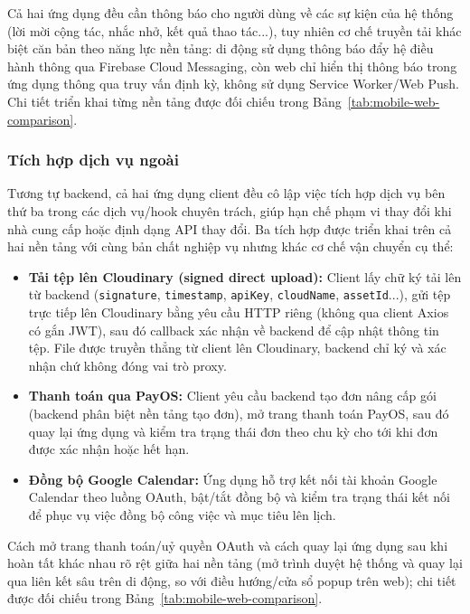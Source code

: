 Cả hai ứng dụng đều cần thông báo cho người dùng về các sự kiện của hệ thống (lời mời cộng tác, nhắc nhở, kết quả thao tác...), tuy nhiên cơ chế truyền tải khác biệt căn bản theo năng lực nền tảng: di động sử dụng thông báo đẩy hệ điều hành thông qua Firebase Cloud Messaging, còn web chỉ hiển thị thông báo trong ứng dụng thông qua truy vấn định kỳ, không sử dụng Service Worker/Web Push. Chi tiết triển khai từng nền tảng được đối chiếu trong Bảng~\ref{tab:mobile-web-comparison}.

\subsubsection{Tích hợp dịch vụ ngoài}
\label{subsubsec:frontend-integrations}

Tương tự backend, cả hai ứng dụng client đều cô lập việc tích hợp dịch vụ bên thứ ba trong các dịch vụ/hook chuyên trách, giúp hạn chế phạm vi thay đổi khi nhà cung cấp hoặc định dạng API thay đổi. Ba tích hợp được triển khai trên cả hai nền tảng với cùng bản chất nghiệp vụ nhưng khác cơ chế vận chuyển cụ thể:

\begin{itemize}
    \item \textbf{Tải tệp lên Cloudinary (signed direct upload):} Client lấy chữ ký tải lên từ backend (\texttt{signature}, \texttt{timestamp}, \texttt{apiKey}, \texttt{cloudName}, \texttt{assetId}...), gửi tệp trực tiếp lên Cloudinary bằng yêu cầu HTTP riêng (không qua client Axios có gắn JWT), sau đó callback xác nhận về backend để cập nhật thông tin tệp. File được truyền thẳng từ client lên Cloudinary, backend chỉ ký và xác nhận chứ không đóng vai trò proxy.
    \item \textbf{Thanh toán qua PayOS:} Client yêu cầu backend tạo đơn nâng cấp gói (backend phân biệt nền tảng tạo đơn), mở trang thanh toán PayOS, sau đó quay lại ứng dụng và kiểm tra trạng thái đơn theo chu kỳ cho tới khi đơn được xác nhận hoặc hết hạn.
    \item \textbf{Đồng bộ Google Calendar:} Ứng dụng hỗ trợ kết nối tài khoản Google Calendar theo luồng OAuth, bật/tắt đồng bộ và kiểm tra trạng thái kết nối để phục vụ việc đồng bộ công việc và mục tiêu lên lịch.
\end{itemize}

Cách mở trang thanh toán/uỷ quyền OAuth và cách quay lại ứng dụng sau khi hoàn tất khác nhau rõ rệt giữa hai nền tảng (mở trình duyệt hệ thống và quay lại qua liên kết sâu trên di động, so với điều hướng/cửa sổ popup trên web); chi tiết được đối chiếu trong Bảng~\ref{tab:mobile-web-comparison}.

